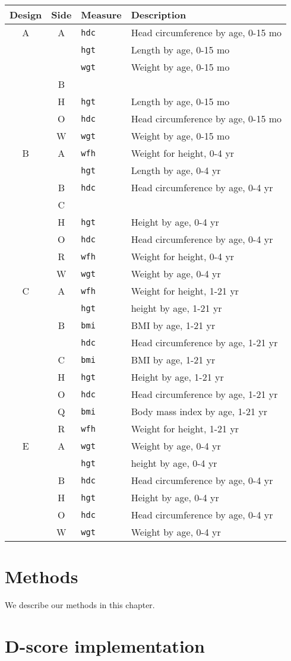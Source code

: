 \documentclass[]{book}
\begin{document}
\begin{longtable}[]{@{}ccll@{}}
\toprule
Design & Side & Measure & Description\tabularnewline
\midrule
\endhead
A & A & \texttt{hdc} & Head circumference by age, 0-15 mo\tabularnewline
& & \texttt{hgt} & Length by age, 0-15 mo\tabularnewline
& & \texttt{wgt} & Weight by age, 0-15 mo\tabularnewline
& B & &\tabularnewline
& H & \texttt{hgt} & Length by age, 0-15 mo\tabularnewline
& O & \texttt{hdc} & Head circumference by age, 0-15 mo\tabularnewline
& W & \texttt{wgt} & Weight by age, 0-15 mo\tabularnewline
B & A & \texttt{wfh} & Weight for height, 0-4 yr\tabularnewline
& & \texttt{hgt} & Length by age, 0-4 yr\tabularnewline
& B & \texttt{hdc} & Head circumference by age, 0-4 yr\tabularnewline
& C & &\tabularnewline
& H & \texttt{hgt} & Height by age, 0-4 yr\tabularnewline
& O & \texttt{hdc} & Head circumference by age, 0-4 yr\tabularnewline
& R & \texttt{wfh} & Weight for height, 0-4 yr\tabularnewline
& W & \texttt{wgt} & Weight by age, 0-4 yr\tabularnewline
C & A & \texttt{wfh} & Weight for height, 1-21 yr\tabularnewline
& & \texttt{hgt} & height by age, 1-21 yr\tabularnewline
& B & \texttt{bmi} & BMI by age, 1-21 yr\tabularnewline
& & \texttt{hdc} & Head circumference by age, 1-21 yr\tabularnewline
& C & \texttt{bmi} & BMI by age, 1-21 yr\tabularnewline
& H & \texttt{hgt} & Height by age, 1-21 yr\tabularnewline
& O & \texttt{hdc} & Head circumference by age, 1-21 yr\tabularnewline
& Q & \texttt{bmi} & Body mass index by age, 1-21 yr\tabularnewline
& R & \texttt{wfh} & Weight for height, 1-21 yr\tabularnewline
E & A & \texttt{wgt} & Weight by age, 0-4 yr\tabularnewline
& & \texttt{hgt} & height by age, 0-4 yr\tabularnewline
& B & \texttt{hdc} & Head circumference by age, 0-4 yr\tabularnewline
& H & \texttt{hgt} & Height by age, 0-4 yr\tabularnewline
& O & \texttt{hdc} & Head circumference by age, 0-4 yr\tabularnewline
& W & \texttt{wgt} & Weight by age, 0-4 yr\tabularnewline
\bottomrule
\end{longtable}

\hypertarget{methods}{%
\chapter{Methods}\label{methods}}

We describe our methods in this chapter.

\hypertarget{d-score-implementation}{%
\chapter{D-score implementation}\label{d-score-implementation}}
\end{document}

